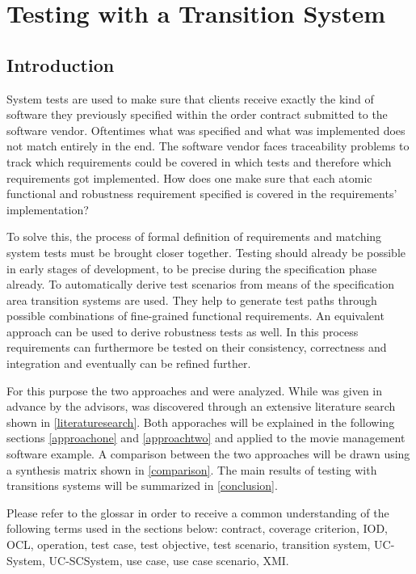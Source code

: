 \chapter{Testing with a Transition System}

\section{Introduction}

System tests are used to make sure that clients receive exactly the kind of software they previously specified within the order contract submitted to the software vendor. Oftentimes what was specified and what was implemented does not match entirely in the end. The software vendor faces traceability problems to track which requirements could be covered in which tests and therefore which requirements got implemented. How does one make sure that each atomic functional and robustness requirement specified is covered in the requirements' implementation?

To solve this, the process of formal definition of requirements and matching system tests must be brought closer together. Testing should already be possible in early stages of development, to be precise during the specification phase already. To automatically derive test scenarios from means of the specification area transition systems are used. They help to generate test paths through possible combinations of fine-grained functional requirements. An equivalent approach can be used to derive robustness tests as well. In this process requirements can furthermore be tested on their consistency, correctness and integration and eventually can be refined further.

For this purpose the two approaches \cite{ClementineNebut2006} and \cite{NajlaRaza2007} were analyzed. While \cite{ClementineNebut2006} was given in advance by the advisors, \cite{NajlaRaza2007} was discovered through an extensive literature search shown in \autoref{literaturesearch}. Both apporaches will be explained in the following sections \ref{approachone} and \ref{approachtwo} and applied to the movie management software example. A comparison between the two approaches will be drawn using a synthesis matrix shown in \autoref{comparison}. The main results of testing with transitions systems will be summarized in \autoref{conclusion}. 

Please refer to the glossar in order to receive a common understanding of the following terms used in the sections below: contract, coverage criterion, IOD, OCL, operation, test case, test objective, test scenario, transition system, UC-System, UC-SCSystem, use case, use case scenario, XMI.

